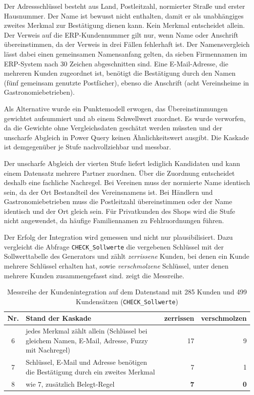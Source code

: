 \documentclass[a4paper,12pt]{article}
\newcommand{\pq}[1]{\texttt{#1}}        %
\begin{document}
Der Adressschlüssel besteht aus Land, Postleitzahl, normierter Straße und erster Hausnummer. Der Name ist bewusst nicht enthalten, damit er als unabhängiges zweites Merkmal zur Bestätigung dienen kann. Kein Merkmal entscheidet allein. Der Verweis auf die ERP-Kundennummer gilt nur, wenn Name oder Anschrift übereinstimmen, da der Verweis in drei Fällen fehlerhaft ist. Der Namensvergleich lässt dabei einen gemeinsamen Namensanfang gelten, da sieben Firmennamen im ERP-System nach 30 Zeichen abgeschnitten sind. Eine E-Mail-Adresse, die mehreren Kunden zugeordnet ist, benötigt die Bestätigung durch den Namen (fünf gemeinsam genutzte Postfächer), ebenso die Anschrift (acht Vereinsheime in Gastronomiebetrieben).

Als Alternative wurde ein Punktemodell erwogen, das Übereinstimmungen gewichtet aufsummiert und ab einem Schwellwert zuordnet. Es wurde verworfen, da die Gewichte ohne Vergleichsdaten geschätzt werden müssten und der unscharfe Abgleich in Power Query keinen Ähnlichkeitswert ausgibt. Die Kaskade ist demgegenüber je Stufe nachvollziehbar und messbar.

Der unscharfe Abgleich der vierten Stufe liefert lediglich Kandidaten und kann einem Datensatz mehrere Partner zuordnen. Über die Zuordnung entscheidet deshalb eine fachliche Nachregel. Bei Vereinen muss der normierte Name identisch sein, da der Ort Bestandteil des Vereinsnamens ist. Bei Händlern und Gastronomiebetrieben muss die Postleitzahl übereinstimmen oder der Name identisch und der Ort gleich sein. Für Privatkunden des Shops wird die Stufe nicht angewendet, da häufige Familiennamen zu Fehlzuordnungen führen.

Der Erfolg der Integration wird gemessen und nicht nur plausibilisiert. Dazu vergleicht die Abfrage \pq{CHECK\_Sollwerte} die vergebenen Schlüssel mit der Sollwerttabelle des Generators und zählt \emph{zerrissene} Kunden, bei denen ein Kunde mehrere Schlüssel erhalten hat, sowie \emph{verschmolzene} Schlüssel, unter denen mehrere Kunden zusammengefasst sind.  zeigt die Messreihe.

\begin{table}[H]
  \centering\small
  \caption{Messreihe der Kundenintegration auf dem Datenstand mit 285 Kunden und 499 Kundensätzen (\pq{CHECK\_Sollwerte})}
  \label{tab:messreihe}
  \begin{tabular}{@{}c>{\raggedright\arraybackslash}p{9.4cm}rr@{}}
    \toprule
    Nr. & Stand der Kaskade & zerrissen & verschmolzen \\
    \midrule
    6 & jedes Merkmal zählt allein (Schlüssel bei gleichem Namen, E-Mail, Adresse, Fuzzy mit Nachregel) & 17 & 9 \\
    7 & Schlüssel, E-Mail und Adresse benötigen die Bestätigung durch ein zweites Merkmal & 7 & 1 \\
    8 & wie 7, zusätzlich Belegt-Regel & \textbf{7} & \textbf{0} \\
    \bottomrule
  \end{tabular}
\end{table}
\end{document}
